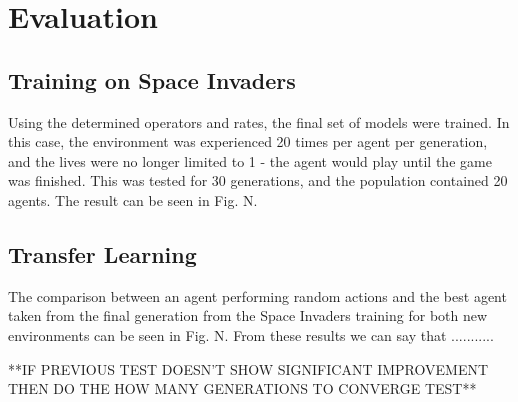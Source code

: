 \chapter{Evaluation}

\label{ch:eval}

\section{Training on Space Invaders}

Using the determined operators and rates, the final set of models were trained. In this case, the environment was experienced 20 times per agent per generation, and the lives were no longer limited to 1 - the agent would play until the game was finished. This was tested for 30 generations, and the population contained 20 agents. The result can be seen in Fig. N.

\section{Transfer Learning}

The comparison between an agent performing random actions and the best agent taken from the final generation from the Space Invaders training for both new environments can be seen in Fig. N. From these results we can say that ...........


**IF PREVIOUS TEST DOESN'T SHOW SIGNIFICANT IMPROVEMENT THEN DO THE HOW MANY GENERATIONS TO CONVERGE TEST**
